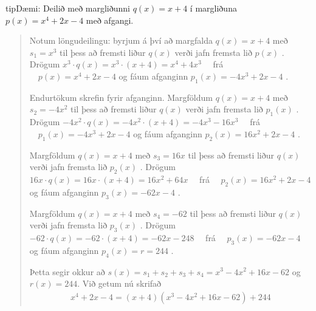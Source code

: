 \documentclass[a4paper,10pt,icelandic]{sphinxmanual}
\begin{document}
\begin{sphinxadmonition}{tip}{Dæmi:}
 Deilið með margliðunni \(q(x)=x+4\) í margliðuna \(p(x) =x^4 + 2x - 4\) með afgangi.
\begin{quote}

Notum löngudeilingu: byrjum á því að margfalda \(q(x)=x+4\) með \(s_1=x^3\) til þess að fremsti liður \(q(x)\) verði jafn fremsta lið \(p(x)\) .
Drögum \(x^3 \cdot q(x)=x^3\cdot(x+4) = x^4+4x^3 \quad\) frá \(\quad p(x) =x^4 + 2x - 4\) og fáum afganginn \(p_1(x)=-4x^3+2x-4\) .


Endurtökum skrefin fyrir afganginn.
Margföldum \(q(x)=x+4\) með \(s_2=-4x^2\) til þess að fremsti liður \(q(x)\) verði jafn fremsta lið \(p_1(x)\) .
Drögum \(-4x^2 \cdot q(x)=-4x^2\cdot(x+4) = -4x^3-16x^3 \quad\)  frá  \(\quad p_1(x)=-4x^3+2x-4\) og fáum afganginn \(p_2(x)=16x^2+2x-4\) .


Margföldum \(q(x)=x+4\) með \(s_3=16x\) til þess að fremsti liður \(q(x)\) verði jafn fremsta lið \(p_2(x)\) .
Drögum \(16x \cdot q(x)=16x\cdot(x+4) = 16x^2+64x \quad\) frá \(\quad p_2(x)=16x^2+2x-4\) og fáum afganginn \(p_3(x)=-62x-4\) .


Margföldum \(q(x)=x+4\) með \(s_4=-62\) til þess að fremsti liður \(q(x)\) verði jafn fremsta lið \(p_3(x)\) .
Drögum \(-62 \cdot q(x)=-62\cdot(x+4) = -62x-248 \quad\) frá \(\quad p_3(x)=-62x-4\) og fáum afganginn \(p_4(x)=r=244\) .


Þetta segir okkur að \(s(x) = s_1+s_2+s_3+s_4 = x^3 -4x^2 +16x -62\) og \(r(x) = 244\). Við getum nú skrifað
\begin{equation*}
\begin{split}x^4 +2x -4 = (x+4)(x^3 - 4x^2 + 16x - 62) + 244\end{split}
\end{equation*}\end{quote}


\end{sphinxadmonition}
\end{document}
